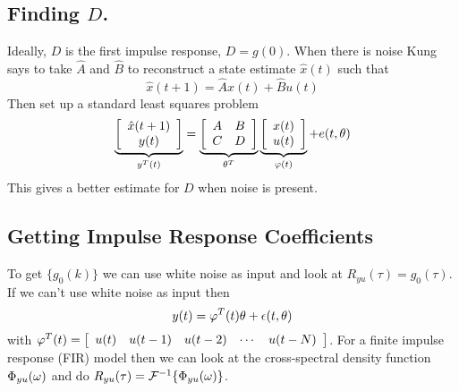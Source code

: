 \subsection{Finding $D$.}
Ideally, $D$ is the first impulse response, $D=g(0)$. When there is noise Kung says to take $\hat{A}$ and $\hat{B}$ to reconstruct a state estimate $\hat{x}(t)$ such that
$$\hat{x}(t+1) = \hat{A}x(t)+\hat{B}u(t)$$
Then set up a standard least squares problem
\begin{align*}
\underbrace{\left[\begin{array}{c} \hat{x}(t+1) \\ y(t) \end{array}\right]}_{y^T(t)}
= \underbrace{\left[\begin{array}{c c} A & B \\ C & D \end{array}\right]}_{\theta^T}
\underbrace{\left[\begin{array}{c} x(t) \\ u(t) \end{array}\right]}_{\varphi(t)} + e(t,\theta)
\end{align*}
This gives a better estimate for $D$ when noise is present.

\subsection{Getting Impulse Response Coefficients}
To get $\{g_0(k)\}$ we can use white noise as input and look at $R_{yu}(\tau)=g_0(\tau)$. If we can't use white noise as input then
$$y(t) = \varphi^T(t)\theta+\epsilon(t,\theta)$$
with $\varphi^T(t) = \left[\begin{array}{c c c c c} u(t) & u(t-1) & u(t-2) & \cdots & u(t-N) \end{array}\right]$. For a finite impulse response (FIR) model then we can look at the cross-spectral density function $\Phi_{yu}(\omega)$ and do $R_{yu}(\tau) = \mathcal{F}^{-1}\{\Phi_{yu}(\omega)\}$.

